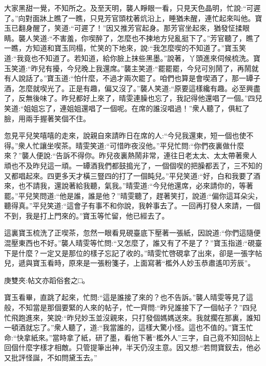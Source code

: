 \begin{parag}
    大家黑甜一覺，不知所之。及至天明，襲人睜眼一看，只見天色晶明，忙說:“可遲了。”向對面牀上瞧了一瞧，只見芳官頭枕著炕沿上，睡猶未醒，連忙起來叫他。寶玉已翻身醒了，笑道:“可遲了！”因又推芳官起身。那芳官坐起來，猶發怔揉眼睛。襲人笑道:“不害羞，你喫醉了，怎麼也不揀地方兒亂挺下了。”芳官聽了，瞧了一瞧，方知道和寶玉同榻，忙笑的下地來，說:“我怎麼喫的不知道了。”寶玉笑道:“我竟也不知道了。若知道，給你臉上抹些黑墨。”說著，丫頭進來伺候梳洗。寶玉笑道:“昨兒有擾，今兒晚上我還席。”襲主笑道:“罷罷罷，今兒可別鬧了，再鬧就有人說話了。”寶玉道:“怕什麼，不過才兩次罷了。咱們也算是會喫酒了，那一罈子酒，怎麼就喫光了。正是有趣，偏又沒了。”襲人笑道:“原要這樣纔有趣。必至興盡了，反無後味了。昨兒都好上來了，晴雯連臊也忘了，我記得他還唱了一個。”四兒笑道:“姐姐忘了，連姐姐還唱了一個呢。在席的誰沒唱過！”衆人聽了，俱紅了臉，用兩手握著笑個不住。
\end{parag}


\begin{parag}
    忽見平兒笑嘻嘻的走來，說親自來請昨日在席的人:“今兒我還東，短一個也使不得。”衆人忙讓坐喫茶。晴雯笑道:“可惜昨夜沒他。”平兒忙問:“你們夜裏做什麼來？”襲人便說:“告訴不得你。昨兒夜裏熱鬧非常，連往日老太太、太太帶著衆人頑也不及昨兒這一頑。一罈酒我們都鼓搗光了，一個個喫的把臊都丟了，三不知的又都唱起來。四更多天才橫三豎四的打了一個盹兒。”平兒笑道:“好，白和我要了酒來，也不請我，還說著給我聽，氣我。”晴雯道:“今兒他還席，必來請你的，等著罷。”平兒笑問道:“他是誰，誰是他？”晴雯聽了，趕著笑打，說道:“偏你這耳朵尖，聽得真。”平兒笑道:“這會子有事不和你說，我幹事去了。一回再打發人來請，一個不到，我是打上門來的。”寶玉等忙留，他已經去了。
\end{parag}


\begin{parag}
    這裏寶玉梳洗了正喫茶，忽然一眼看見硯臺底下壓著一張紙，因說道:“你們這隨便混壓東西也不好。”襲人晴雯等忙問:“又怎麼了，誰又有了不是了？”寶玉指道:“硯臺下是什麼？一定又是那位的樣子忘記了收的。”晴雯忙啓硯拿了出來，卻是一張字帖兒，遞與寶玉看時，原來是一張粉箋子，上面寫著“檻外人妙玉恭肅遙叩芳辰”。\begin{note}庚雙夾:帖文亦蹈俗套之□。\end{note}寶玉看畢，直跳了起來，忙問:“這是誰接了來的？也不告訴。”襲人晴雯等見了這般，不知當是那個要緊的人來的帖子，忙一齊問:“昨兒誰接下了一個帖子？”四兒忙飛跑進來，笑說:“昨兒妙玉並沒親來，只打發個媽媽送來。我就擱在那裏，誰知一頓酒就忘了。”衆人聽了，道:“我當誰的，這樣大驚小怪。這也不值的。”寶玉忙命:“快拿紙來。”當時拿了紙，研了墨，看他下著“檻外人”三字，自己竟不知回帖上回個什麼字樣才相敵。只管提筆出神，半天仍沒主意。因又想:“若問寶釵去，他必又批評怪誕，不如問黛玉去。”
\end{parag}


